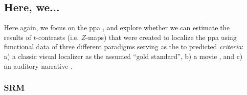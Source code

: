 \subsection{Here, we...}



Here again, we focus on the \ac{ppa} \citep[e.g.,][for
reviews]{epstein2014neural, aminoff2013role}, and explore whether we can
estimate the results of $t$-contrasts (i.e. $Z$-maps) that were created to
localize the \ac{ppa} using functional data of three different paradigms serving
as the to predicted \textit{criteria}:
%
a) a classic visual localizer \citep{sengupta2016extension} as the assumed
``gold standard'',
%
b) a movie \citep{haeusler2022processing}, and
%
c) an auditory narrative \citep{haeusler2022processing}.


\subsubsection{SRM}




